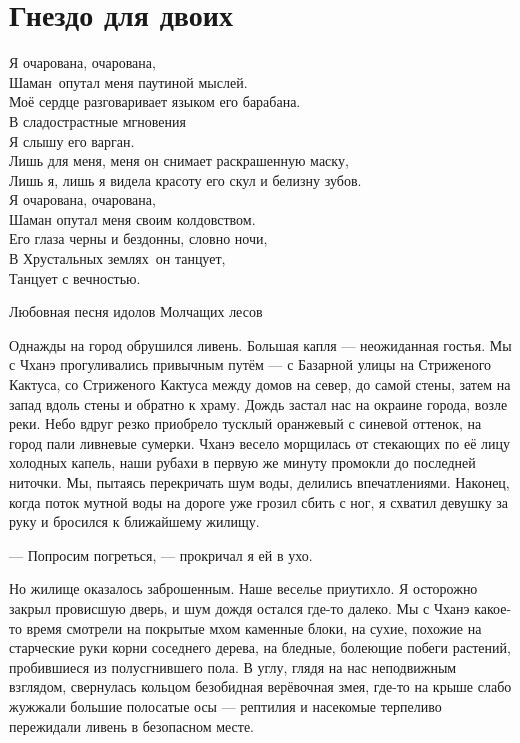 \section{Гнездо для двоих}


\epigraph
{Я очарована, очарована,\\
Шаман\FM\ опутал меня паутиной мыслей.\\
Моё сердце разговаривает языком его барабана.\\
В сладострастные мгновения\\
Я слышу его варган.\\
Лишь для меня, меня он снимает раскрашенную маску,\\
Лишь я, лишь я видела красоту его скул и белизну зубов.\\
Я очарована, очарована,\\
Шаман опутал меня своим колдовством.\\
Его глаза черны и бездонны, словно ночи,\\
В Хрустальных землях\FM\ он танцует,\\
Танцует с вечностью.}
{Любовная песня идолов Молчащих лесов}

Однажды на город обрушился ливень.
Большая капля --- неожиданная гостья.
Мы с Чханэ прогуливались привычным путём --- с Базарной улицы на Стриженого Кактуса, со Стриженого Кактуса между домов на север, до самой стены, затем на запад вдоль стены и обратно к храму.
Дождь застал нас на окраине города, возле реки.
Небо вдруг резко приобрело тусклый оранжевый с синевой оттенок, на город пали ливневые сумерки.
Чханэ весело морщилась от стекающих по её лицу холодных капель, наши рубахи в первую же минуту промокли до последней ниточки.
Мы, пытаясь перекричать шум воды, делились впечатлениями.
Наконец, когда поток мутной воды на дороге уже грозил сбить с ног, я схватил девушку за руку и бросился к ближайшему жилищу.

--- Попросим погреться, --- прокричал я ей в ухо.

Но жилище оказалось заброшенным.
Наше веселье приутихло.
Я осторожно закрыл провисшую дверь, и шум дождя остался где-то далеко.
Мы с Чханэ какое-то время смотрели на покрытые мхом каменные блоки, на сухие, похожие на старческие руки корни соседнего дерева, на бледные, болеющие побеги растений, пробившиеся из полусгнившего пола.
В углу, глядя на нас неподвижным взглядом, свернулась кольцом безобидная верёвочная змея, где-то на крыше слабо жужжали большие полосатые осы --- рептилия и насекомые терпеливо пережидали ливень в безопасном месте.

